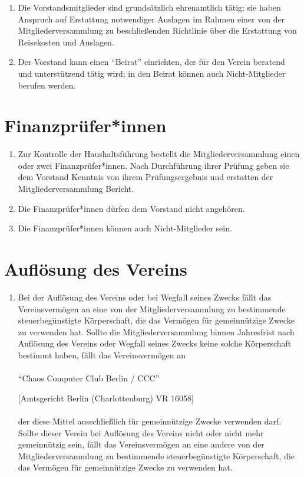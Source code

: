 \documentclass[a4paper]{article}
\begin{document}
\begin{enumerate}
	\item Die Vorstandsmitglieder sind grundsätzlich ehrenamtlich tätig; sie haben Anspruch auf Erstattung notwendiger Auslagen im Rahmen einer von der Mitgliederversammlung zu beschließenden Richtlinie über die Erstattung von Reisekosten und Auslagen. 
	
	\item Der Vorstand kann einen \enquote{Beirat} einrichten, der für den Verein beratend und unterstützend tätig wird; in den Beirat können auch Nicht-Mitglieder berufen werden. 

\end{enumerate}

\section{Finanzprüfer*innen}
\begin{enumerate}
	\item Zur Kontrolle der Haushaltsführung bestellt die Mitgliederversammlung einen oder zwei Finanzprüfer*innen. Nach Durchführung ihrer Prüfung geben sie dem Vorstand Kenntnis von ihrem Prüfungsergebnis und erstatten der Mitgliederversammlung Bericht.
	\item Die Finanzprüfer*innen dürfen dem Vorstand nicht angehören. 
	\item Die Finanzprüfer*innen können auch Nicht-Mitglieder sein.
\end{enumerate}

\filbreak
\section{Auflösung des Vereins}
\begin{enumerate}
	\item Bei der Auflösung des Vereins oder bei Wegfall seines Zwecks fällt das Vereinsvermögen an eine von der Mitgliederversammlung zu bestimmende steuerbegünstigte Körperschaft, die das Vermögen für gemeinnützige Zwecke zu verwenden hat. Sollte die Mitgliederversammlung binnen Jahresfrist nach Auflösung des Vereins oder Wegfall seines Zwecks keine solche Körperschaft bestimmt haben, fällt das Vereinsvermögen an
	 \\
	 \\
	\enquote{Chaos Computer Club Berlin / CCC}
	
	[Amtsgericht Berlin (Charlottenburg) VR 16058]
	\\
	\\
	der diese Mittel ausschließlich für gemeinnützige Zwecke verwenden darf. Sollte dieser Verein bei Auflösung des Vereins nicht oder nicht mehr gemeinnützig sein, fällt das Vereinsvermögen an eine andere von der Mitgliederversammlung zu bestimmende steuerbegünstigte Körperschaft, die das Vermögen für gemeinnützige Zwecke zu verwenden hat.
\end{enumerate}
\end{document}
